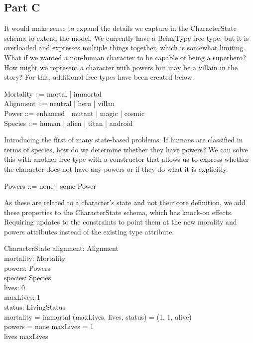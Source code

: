 \documentclass{article}
\begin{document}
\subsection*{Part C}

It would make sense to expand the details we capture in the CharacterState schema to extend the model. We currently have a BeingType free type, but it is overloaded and expresses multiple things together, which is somewhat limiting. What if we wanted a non-human character to be capable of being a superhero? How might we represent a character with powers but may be a villain in the story? For this, additional free types have been created below. 
\begin{zed}
Mortality ::= mortal | immortal \\
Alignment ::= neutral | hero | villan \\
Power ::= enhanced | mutant | magic | cosmic \\
Species ::= human | alien | titan | android \\
\end{zed}

\hspace{-0.64cm} Introducing the first of many state-based problems: If humans are classified in terms of species, how do we determine whether they have powers? We can solve this with another free type with a constructor that allows us to express whether the character does not have any powers or if they do what it is explicitly. 
\begin{zed}
Powers ::= none | some \ldata Power \rdata \\
\end{zed}

\hspace{-0.64cm} As these are related to a character's state and not their core definition, we add these properties to the CharacterState schema, which has knock-on effects. Requiring updates to the constraints to point them at the new morality and powers attributes instead of the existing type attribute.

\begin{schema}{CharacterState}
alignment: Alignment \\
mortality: Mortality \\
powers: Powers \\
species: Species \\
lives: 0   \\ 
maxLives: 1  \\ 
status: LivingStatus \\
\where
mortality = immortal \implies (maxLives, lives, status) = (1, 1, alive) \\
powers = none \implies maxLives = 1 \\ 
lives \leq maxLives \\
\end{schema}
\end{document}

